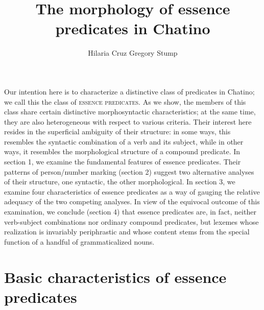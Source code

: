 \documentclass[output=paper]{langsci/langscibook}
\author{Hilaria Cruz\affiliation{Dartmouth College}  \lastand Gregory Stump\affiliation{Professor emeritus, University of Kentucky}}
\title{The morphology of essence predicates in Chatino}
\begin{document}


\section{} 
\largerpage[-3]
Our intention here is to characterize a distinctive class of predicates in Chatino; we call this the class of \textsc{essence predicates}.  As we show, the members of this class share certain distinctive morphosyntactic characteristics; at the same time, they are also heterogeneous with respect to various criteria. Their interest here resides in the superficial ambiguity of their structure:  in some ways, this resembles the syntactic combination of a verb and its subject, while in other ways, it resembles the morphological structure of a compound predicate.  In section 1, we examine the fundamental features of essence predicates.  Their patterns of person/number marking (section 2) suggest two alternative analyses of their structure, one syntactic, the other morphological.  In section 3, we examine four characteristics of essence predicates as a way of gauging the relative adequacy of the two competing analyses.  In view of the equivocal outcome of this examination, we conclude (section 4) that essence predicates  are, in fact, neither verb-subject combinations nor ordinary compound predicates, but lexemes whose realization is invariably periphrastic and whose content stems from the special function of a handful of grammaticalized nouns.

\section{Basic characteristics of essence predicates}
\end{document}
